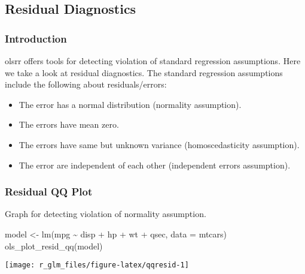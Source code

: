 \documentclass[
]{article}
\newenvironment{Shaded}{\begin{snugshade}}{\end{snugshade}}
\newcommand{\AttributeTok}[1]{\textcolor[rgb]{0.77,0.63,0.00}{#1}}
\newcommand{\FunctionTok}[1]{\textcolor[rgb]{0.00,0.00,0.00}{#1}}
\newcommand{\NormalTok}[1]{#1}
\newcommand{\OtherTok}[1]{\textcolor[rgb]{0.56,0.35,0.01}{#1}}
\newcommand{\SpecialCharTok}[1]{\textcolor[rgb]{0.00,0.00,0.00}{#1}}
\providecommand{\tightlist}{%
  \setlength{\itemsep}{0pt}\setlength{\parskip}{0pt}}
\begin{document}
\hypertarget{residual-diagnostics}{%
\subsection{Residual Diagnostics}\label{residual-diagnostics}}

\hypertarget{introduction-1}{%
\subsubsection{Introduction}\label{introduction-1}}

olsrr offers tools for detecting violation of standard regression
assumptions. Here we take a look at residual diagnostics. The standard
regression assumptions include the following about residuals/errors:

\begin{itemize}
\tightlist
\item
  The error has a normal distribution (normality assumption).
\item
  The errors have mean zero.
\item
  The errors have same but unknown variance (homoscedasticity
  assumption).
\item
  The error are independent of each other (independent errors
  assumption).
\end{itemize}

\hypertarget{residual-qq-plot}{%
\subsubsection{Residual QQ Plot}\label{residual-qq-plot}}

Graph for detecting violation of normality assumption.

\begin{Shaded}
\begin{Highlighting}[]
\NormalTok{model }\OtherTok{\textless{}{-}} \FunctionTok{lm}\NormalTok{(mpg }\SpecialCharTok{\textasciitilde{}}\NormalTok{ disp }\SpecialCharTok{+}\NormalTok{ hp }\SpecialCharTok{+}\NormalTok{ wt }\SpecialCharTok{+}\NormalTok{ qsec, }\AttributeTok{data =}\NormalTok{ mtcars)}
\FunctionTok{ols\_plot\_resid\_qq}\NormalTok{(model)}
\end{Highlighting}
\end{Shaded}

\begin{center}\texttt{[image: r\_glm\_files/figure-latex/qqresid-1]} \end{center}
\end{document}
